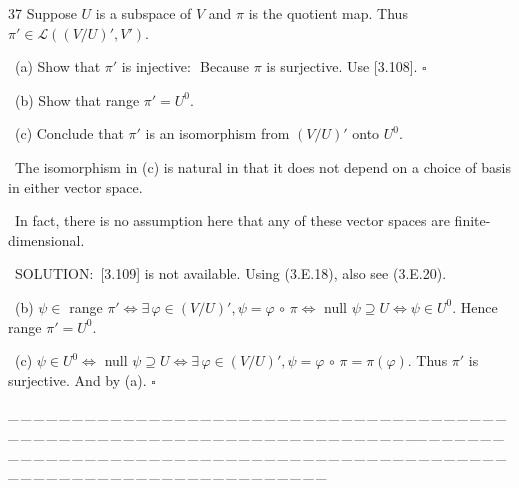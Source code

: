 \documentclass[a4paper, 11pt, UTF8]{article}
\def\Lm{\mathcal{L}}
\begin{document}
\begin{large}
{\timesbf\Large 37} {\timessl\Large Suppose $U$ is a subspace of $V$ and $\pi$ is the quotient map. Thus $\pi'\in\Lm((V/U)',V')$.}\par\quad\,
(a) {\timessl\Large Show that $\pi'$ is injective:\,\,\,\,{\large Because $\pi$ is surjective. Use [3.108]. $\square$}}\par\quad\,
(b) {\timessl\Large Show that range $\pi'=U^0$.}\par\quad\,
(c) {\timessl\Large Conclude that $\pi'$ is an isomorphism from $(V/U)'$ onto $U^0$.}\par\quad\,
{\timessl\normalsize The isomorphism in (c) is natural in that it does not depend on a choice of basis in either vector space.}\par\quad\,
{\timessl\normalsize In fact, there is no assumption here that any of these vector spaces are finite-dimensional.}\par\quad\,
{\timesbf S\footnotesize{OLUTION:}}\,\,\,[3.109] is not available. Using (3.E.18), also see (3.E.20).\par\quad\,
(b) $\psi\in$ range $\pi'\Longleftrightarrow\exists\,\varphi\in (V/U)',\psi=\varphi\,\circ\,\pi\Longleftrightarrow$ null $\psi\supseteq U\Longleftrightarrow \psi\in U^0$. Hence range $\pi'=U^0$.\par\quad\,
(c) $\psi\in U^0\Longleftrightarrow$ null $\psi\supseteq U\Longleftrightarrow\exists\,\varphi\in (V/U)',\psi=\varphi\,\circ\,\pi=\pi(\varphi)$. Thus $\pi'$ is surjective. And by (a). $\square$\par 
{\tiny \_\,\_\,\_\,\_\,\_\,\_\,\_\,\_\,\_\,\_\,\_\,\_\,\_\,\_\,\_\,\_\,\_\,\_\,\_\,\_\,\_\,\_\,\_\,\_\,\_\,\_\,\_\,\_\,\_\,\_\,\_\,\_\,\_\,\_\,\_\,\_\,\_\,\_\,\_\,\_\,\_\,\_\,\_\,\_\,\_\,\_\,\_\,\_\,\_\,\_\,\_\,\_\,\_\,\_\,\_\,\_\,\_\,\_\,\_\,\_\,\_\,\_\,\_\,\_\,\_\,\_\,\_\,\_\,\_\,\_\,\_\_\,\_\,\_\,\_\,\_\,\_\,\_\,\_\,\_\,\_\,\_\,\_\,\_\,\_\,\_\,\_\,\_\,\_\,\_\,\_\,\_\,\_\,\_\,\_\,\_\,\_\,\_\,\_\,\_\,\_\,\_\,\_\,\_\,\_\,\_\,\_\,\_\,\_\,\_\,\_\,\_\,\_\,\_\,\_\,\_\,\_\,\_\,\_\,\_\,\_\,\_\,\_\,\_\,\_\,\_\,\_\,\_\,\_\,\_\,\_\,\_\,\_\,\_\,\_\,\_\,\_\,\_\,\_\,\_\,\_\,\_}\par

\par{\tiny\,\par}

{\huge{}} %


\end{large}
\end{document}

